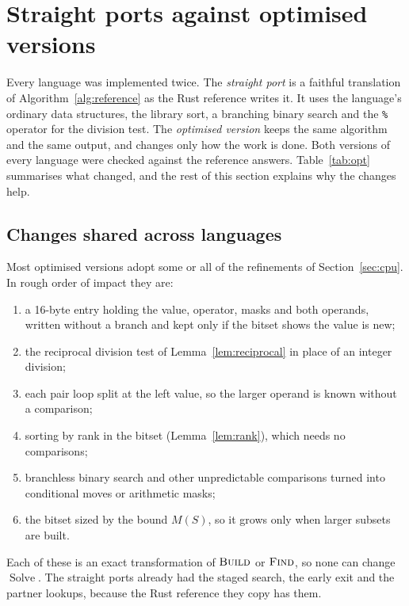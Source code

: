 \documentclass[11pt,a4paper]{article}
\theoremstyle{definition}
\theoremstyle{remark}
\newcommand{\proc}[1]{\textnormal{\textsc{#1}}}
\begin{document}
\section{Straight ports against optimised versions}\label{sec:optimisation}

Every language was implemented twice. The \emph{straight port} is a faithful translation of
Algorithm~\ref{alg:reference} as the Rust reference writes it. It uses the language's ordinary data
structures, the library sort, a branching binary search and the \texttt{\%} operator for the division test.
The \emph{optimised version} keeps the same algorithm and the same output, and changes only how the work is
done. Both versions of every language were checked against the reference answers. Table~\ref{tab:opt}
summarises what changed, and the rest of this section explains why the changes help.

\subsection{Changes shared across languages}

Most optimised versions adopt some or all of the refinements of Section~\ref{sec:cpu}. In rough order of
impact they are:
\begin{enumerate}[label=(\alph*)]
\item a 16-byte entry holding the value, operator, masks and both operands, written without a branch and
      kept only if the bitset shows the value is new;
\item the reciprocal division test of Lemma~\ref{lem:reciprocal} in place of an integer division;
\item each pair loop split at the left value, so the larger operand is known without a comparison;
\item sorting by rank in the bitset (Lemma~\ref{lem:rank}), which needs no comparisons;
\item branchless binary search and other unpredictable comparisons turned into conditional moves or
      arithmetic masks;
\item the bitset sized by the bound $M(S)$, so it grows only when larger subsets are built.
\end{enumerate}
Each of these is an exact transformation of $\proc{Build}$ or $\proc{Find}$, so none can change
$\operatorname{Solve}$. The straight ports already had the staged search, the early exit and the
partner lookups, because the Rust reference they copy has them.
\end{document}
